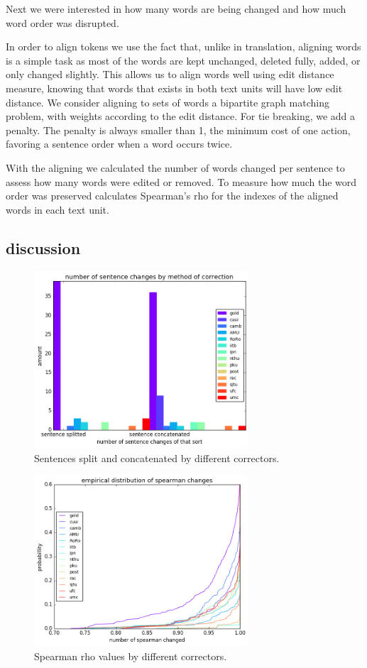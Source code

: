 \documentclass[english]{article}
\begin{document}
Next we were interested in how many words are being changed and how much word order was disrupted. 

In order to align tokens we use the fact that, unlike in translation,
aligning words is a simple task as most of the words are kept unchanged,
deleted fully, added, or only changed slightly. This allows us to
align words well using edit distance measure, knowing that words that
exists in both text units will have low edit distance. We consider
aligning to sets of words a bipartite graph matching problem, with
weights according to the edit distance. For tie breaking, we add a
penalty. The penalty is always smaller than 1, the minimum cost of
one action, favoring a sentence order when a word occurs twice.
 
With the aligning we calculated the number of words changed per sentence to assess how many words were edited or removed. 
To measure how much the word order was preserved
calculates Spearman's rho for the indexes of the aligned words in each text unit.

\subsection{discussion}
\begin{figure}
	\includegraphics[width = 8cm]{aligned}
	\caption{Sentences split and concatenated by different correctors.}
	\label{fig:split}
\end{figure}

\begin{figure}
	\includegraphics[width = 8cm]{spearman_ecdf}
	\caption{Spearman rho values by different correctors.}
	\label{fig:rho}
\end{figure}
\end{document}
